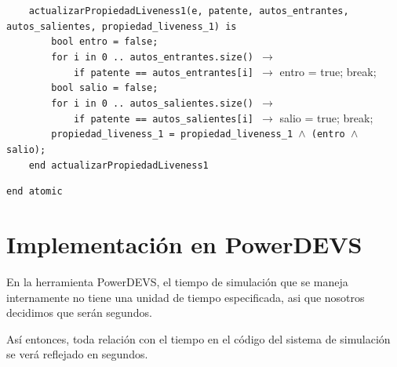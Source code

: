 \documentclass[12pt]{article}
\begin{document}
\begin{tcolorbox}[
    colback=black!5!white,
    colframe=black!80!white,
    boxrule=0.8pt,
    arc=2pt,
    left=5pt,
    right=5pt,
    top=5pt,
    bottom=5pt,
    fontupper=\ttfamily,
    breakable
]
\begin{flushleft}
\texttt{~~~~actualizarPropiedadLiveness1(e, patente, autos\_entrantes, autos\_salientes, propiedad\_liveness\_1) is} \\
\texttt{~~~~~~~~bool entro = false;} \\
\texttt{~~~~~~~~for i in 0 .. autos\_entrantes.size() }\(\rightarrow\) \\
\texttt{~~~~~~~~~~~~if patente == autos\_entrantes[i] }\(\rightarrow\) entro = true; break; \\
\texttt{~~~~~~~~bool salio = false;} \\
\texttt{~~~~~~~~for i in 0 .. autos\_salientes.size() }\(\rightarrow\) \\
\texttt{~~~~~~~~~~~~if patente == autos\_salientes[i] }\(\rightarrow\) salio = true; break; \\
\texttt{~~~~~~~~propiedad\_liveness\_1 = propiedad\_liveness\_1 }\(\land\)\texttt{ (entro }\(\land\)\texttt{ salio);} \\
\texttt{~~~~end actualizarPropiedadLiveness1}
\end{flushleft}

\begin{flushleft}
\texttt{end atomic}
\end{flushleft}
\end{tcolorbox}

\clearpage

\section{Implementación en PowerDEVS}

En la herramienta PowerDEVS, el tiempo de simulación que se maneja internamente no tiene una unidad de tiempo especificada, asi que nosotros decidimos que serán segundos.

Así entonces, toda relación con el tiempo en el código del sistema de simulación se verá reflejado en segundos.
\end{document}
